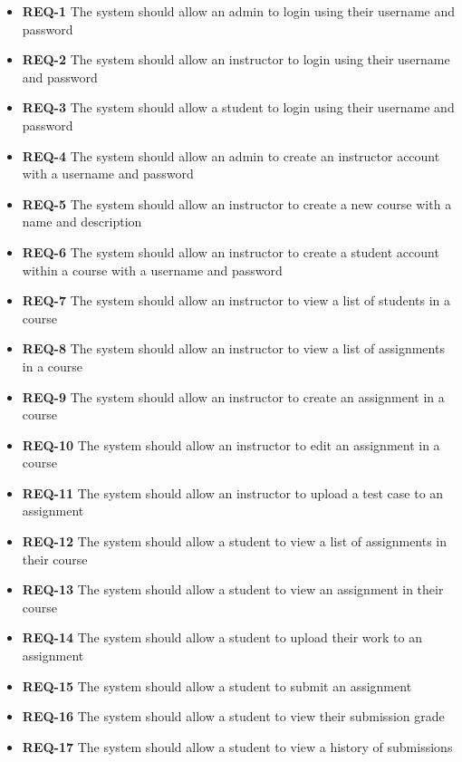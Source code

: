\documentclass{article}
\begin{document}
\begin{itemize}
  \item \textbf{REQ-1} The system should allow an admin to login using their username and password
  \item \textbf{REQ-2} The system should allow an instructor to login using their username and password
  \item \textbf{REQ-3} The system should allow a student to login using their username and password
  \item \textbf{REQ-4} The system should allow an admin to create an instructor account with a username and password
  \item \textbf{REQ-5} The system should allow an instructor to create a new course with a name and description
  \item \textbf{REQ-6} The system should allow an instructor to create a student account within a course with a username and password
  \item \textbf{REQ-7} The system should allow an instructor to view a list of students in a course
  \item \textbf{REQ-8} The system should allow an instructor to view a list of assignments in a course
  \item \textbf{REQ-9} The system should allow an instructor to create an assignment in a course
  \item \textbf{REQ-10} The system should allow an instructor to edit an assignment in a course
  \item \textbf{REQ-11} The system should allow an instructor to upload a test case to an assignment
  \item \textbf{REQ-12} The system should allow a student to view a list of assignments in their course
  \item \textbf{REQ-13} The system should allow a student to view an assignment in their course
  \item \textbf{REQ-14} The system should allow a student to upload their work to an assignment
  \item \textbf{REQ-15} The system should allow a student to submit an assignment
  \item \textbf{REQ-16} The system should allow a student to view their submission grade
  \item \textbf{REQ-17} The system should allow a student to view a history of submissions

\end{itemize}
\end{document}
